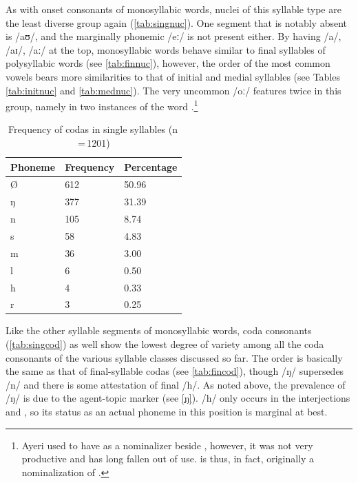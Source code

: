 As with onset consonants of monosyllabic words, nuclei of this syllable type 
are the least diverse group again (\autoref{tab:singnuc}). One segment that is 
notably absent is /aʊ/, and the marginally phonemic /eː/ is not present either. 
By having /a/, /aɪ/, /aː/ at the top, monosyllabic words behave similar to 
final syllables of polysyllabic words (see \autoref{tab:finnuc}), however, the 
order of the most common vowels bears more similarities to that of initial and 
medial syllables (see Tables \ref{tab:initnuc} and \ref{tab:mednuc}). The very 
uncommon /oː/ features twice in this group, namely in two instances of the word 
.\footnote{Ayeri used to have  
as a nominalizer beside , however, it was not very productive 
and 
has long fallen out of use.  is thus, in fact, originally a 
nominalization of .}

\begin{table}[pth]\centering
\caption[Frequency of codas in single syllables]{Frequency of codas in single 
syllables (n\,=\,1201)}
\begin{tabu} to 0.5\linewidth{X X[c] X[c]}
\tableheaderfont\toprule
Phoneme
	& Frequency
	& Percentage
	\\
	
\toprule

Ø
	& 612
	& 50.96\pct\\

\midrule

ŋ
	& 377
	& 31.39\pct\\
n
	& 105
	& 8.74\pct\\
s
	& 58
	& 4.83\pct\\
m
	& 36
	& 3.00\pct\\
l
	& 6
	& 0.50\pct\\
h
	& 4
	& 0.33\pct\\
r
	& 3
	& 0.25\pct\\

\bottomrule
\end{tabu}
\label{tab:singcod}
\end{table}

Like the other syllable segments of monosyllabic words, coda consonants 
(\autoref{tab:singcod}) as well show the lowest degree of variety among all the 
coda consonants of the various syllable classes discussed so far. The order is 
basically the same as that of final-syllable codas (see \autoref{tab:fincod}), 
though /ŋ/ supersedes /n/ and there is some attestation of final /h/. As noted 
above, the prevalence of /ŋ/ is due to the agent-topic marker  
(see \autoref{ŋ}). /h/ only occurs in the interjections  and 
, so its status as an actual phoneme in this position is 
marginal at best.
%


